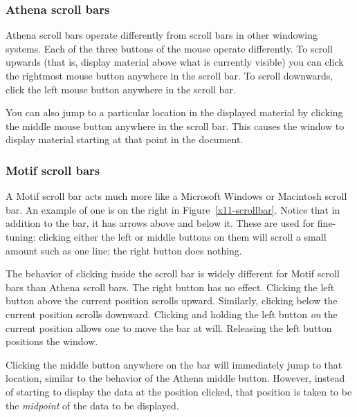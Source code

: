 \subsubsection{Athena scroll bars}

Athena scroll bars operate differently from scroll bars in other
windowing systems.  Each of the three buttons of the mouse operate
differently.  To scroll upwards (that is, display material above what
is currently visible) you can click the rightmost mouse button
anywhere in the scroll bar.  To scroll downwards, click the left mouse
button anywhere in the scroll bar.

You can also jump to a particular location in the displayed material
by clicking the middle mouse button anywhere in the scroll bar.  This
causes the window to display material starting at that point in the
document.

\subsubsection{Motif scroll bars}

A Motif scroll bar acts much more like a Microsoft Windows or
Macintosh scroll bar.  An example of one is on the right in
Figure~\ref{x11-scrollbar}.  Notice that in addition to the bar, it
has arrows above and below it.  These are used for fine-tuning:
clicking either the left or middle buttons on them will scroll a small
amount such as one line; the right button does nothing.

The behavior of clicking inside the scroll bar is widely different for
Motif scroll bars than Athena scroll bars.  The right button has no
effect.  Clicking the left button above the current position scrolls
upward.  Similarly, clicking below the current position scrolls
downward.  Clicking and holding the left button \emph{on} the current
position allows one to move the bar at will.  Releasing the left
button positions the window.

Clicking the middle button anywhere on the bar will immediately jump
to that location, similar to the behavior of the Athena middle
button.  However, instead of starting to display the data at the
position clicked, that position is taken to be the \emph{midpoint} of
the data to be displayed.

